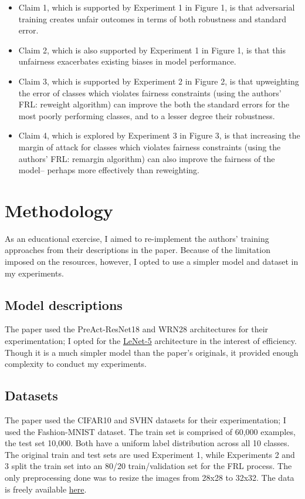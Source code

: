 \begin{itemize}
    \item Claim 1, which is supported by Experiment 1 in Figure 1,  is that adversarial training creates unfair outcomes in terms of both robustness and standard error. 
    \item Claim 2, which is also supported by Experiment 1 in Figure 1, is that this unfairness exacerbates existing biases in model performance. 
    \item Claim 3, which is supported by Experiment 2 in Figure 2,  is that upweighting the error of classes which violates fairness constraints (using the authors' FRL: reweight algorithm) can improve the both the standard errors for the most poorly performing classes, and to a lesser degree their robustness.  
    \item Claim 4, which is explored by Experiment 3 in Figure 3,  is that increasing the margin of attack for classes which violates fairness constraints (using the authors' FRL: remargin algorithm) can also improve the fairness of the model-- perhaps more effectively than reweighting.  
\end{itemize}

\section{Methodology}

As an educational exercise, I aimed to re-implement the authors' training approaches from their descriptions in the paper. Because of the limitation imposed on the resources, however, I opted to use a simpler model and dataset in my experiments. 

\subsection{Model descriptions}
The paper used the PreAct-ResNet18 and WRN28 architectures for their experimentation; I opted for the \href{http://yann.lecun.com/exdb/publis/pdf/lecun-01a.pdf}{LeNet-5} architecture in the interest of efficiency. Though it is a much simpler model than the paper's originals, it provided enough complexity to conduct my experiments. 

\subsection{Datasets}
The paper used the CIFAR10 and SVHN datasets for their experimentation; I used the Fashion-MNIST dataset. The train set is comprised of 60,000 examples, the test set 10,000. Both have a uniform label distribution across all 10 classes. The original train and test sets are used Experiment 1, while Experiments 2 and 3 split the train set into an 80/20 train/validation set for the FRL process. The only preprocessing done was to resize the images from 28x28 to 32x32. The data is freely available \href{https://github.com/zalandoresearch/fashion-mnist}{here}.

